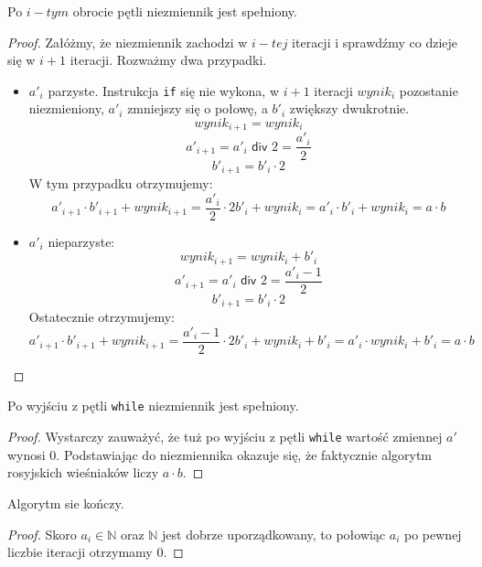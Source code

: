 \begin{lemma}
Po $i-tym$ obrocie pętli niezmiennik jest spełniony.
\end{lemma}
\begin{proof}
Załóżmy, że niezmiennik zachodzi w $i-tej$ iteracji i sprawdźmy co dzieje się w $i+1$ iteracji.
Rozważmy dwa przypadki.


\begin{itemize}
    \item $a'_i$ parzyste. Instrukcja \texttt{if} się nie wykona, w $i+1$ iteracji $wynik_i$ pozostanie niezmieniony, $a'_i$ zmniejszy się o połowę, a $b'_i$ zwiększy dwukrotnie. 
    \[
      wynik_{i+1} = wynik_i
    \]
    \[
      a'_{i+1} = a'_i \textsf{ div } 2 = \frac{a'_i}{2}
    \]
    \[
      b'_{i+1} = b'_i \cdot 2
    \]
    W tym przypadku otrzymujemy:
    \[
      a'_{i+1} \cdot b'_{i+1} + wynik_{i+1} = \frac{a'_i}{2} \cdot 2 b'_i + wynik_i = a'_i \cdot b'_i + wynik_i = a \cdot b
    \]

    \item $a'_i$ nieparzyste:
    \[
      wynik_{i+1} = wynik_i + b'_i
    \]
    \[
      a'_{i+1} = a'_i \textsf{ div } 2 = \frac{a'_i-1}{2}
    \]
    \[
      b'_{i+1} = b'_i \cdot 2
    \]
    Ostatecznie otrzymujemy:
    \[
      a'_{i+1} \cdot b'_{i+1} + wynik_{i+1} = \frac{a'_i-1}{2} \cdot 2 b'_i + wynik_i +b'_i = a'_i \cdot wynik_i + b'_i= a \cdot b
    \]

\end{itemize}

\end{proof}

\begin{lemma}
Po wyjściu z pętli \texttt{while} niezmiennik jest spełniony.

\end{lemma}
\begin{proof}
Wystarczy zauważyć, że tuż po wyjściu z pętli \texttt{while} wartość zmiennej $a'$ wynosi $0$.
Podstawiając do niezmiennika okazuje się, że faktycznie algorytm rosyjskich wieśniaków liczy $a \cdot b$.
\end{proof}

\begin{lemma}
Algorytm sie kończy.
\end{lemma}
\begin{proof}
Skoro $a_i \in \mathbb{N} $ oraz $\mathbb{N}$ jest dobrze uporządkowany, to połowiąc $a_i$ po pewnej liczbie iteracji otrzymamy 0.
\end{proof}

